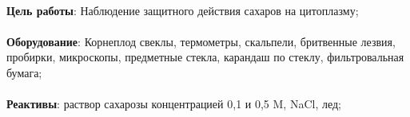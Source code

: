 




\begin{footnotesize}

\paragraph*{}\textbf{Цель работы}: Наблюдение защитного действия сахаров на цитоплазму;
\paragraph*{}\textbf{Оборудование}: Корнеплод свеклы, термометры, скальпели, бритвенные лезвия, пробирки, микроскопы, предметные стекла, карандаш по стеклу, фильтровальная бумага;

\paragraph*{}\textbf{Реактивы}: раствор сахарозы концентрацией 0,1 и 0,5 M, NaCl, лед;

\end{footnotesize}

